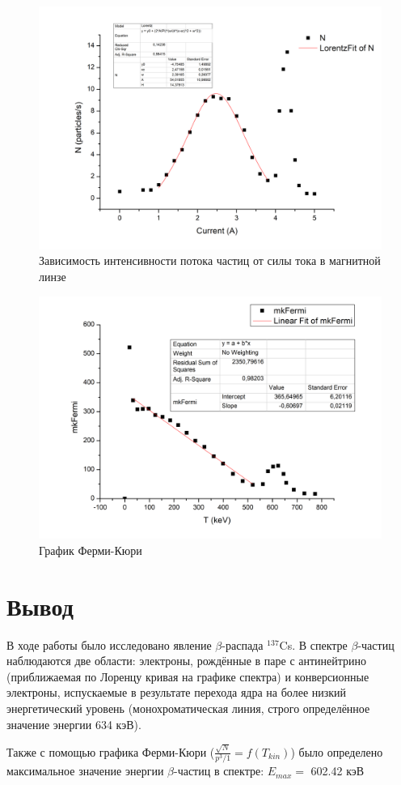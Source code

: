 \documentclass[a4paper]{article}
\begin{document}
\begin{enumerate}
\begin{figure}[h!]
			\centering
			\includegraphics[width=\linewidth]{N(I).png}
			\caption{Зависимость интенсивности потока частиц от силы тока в магнитной линзе}
		\end{figure}
		
\begin{figure}[h!]
			\centering
			\includegraphics[width=\linewidth]{Fermi.png}
			\caption{График Ферми-Кюри}
		\end{figure}
		
\end{enumerate}

\section{Вывод}
	В ходе работы было исследовано явление $\beta$-распада $^{137}$Cs. В спектре $\beta$-частиц наблюдаются две области: электроны, рождённые в паре с антинейтрино (приближаемая по Лоренцу кривая на графике спектра) и конверсионные электроны, испускаемые в результате перехода ядра на более низкий энергетический уровень (монохроматическая линия, строго определённое значение энергии 634 кэВ). \par
	Также с помощью графика Ферми-Кюри ($\frac{\sqrt{N}}{p^3/1} = f(T_{kin})$) было определено максимальное значение энергии $\beta$-частиц в спектре: $E_{max} = $ 602.42 кэВ
\end{document}
